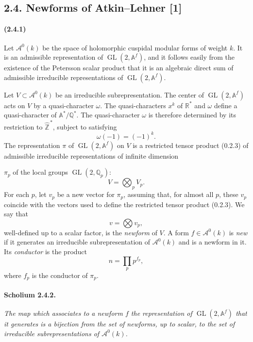\documentclass[10pt,a4paper]{article}
\providecommand{\GL}{\operatorname{GL}}
\providecommand{\R}{\mathbb R}
\providecommand{\Q}{\mathbb Q}
\providecommand{\Z}{\mathbb Z}
\providecommand{\A}{\mathbb A}
\providecommand{\Af}{\mathbb A^f}
\begin{document}
\subsection*{2.4. Newforms of Atkin--Lehner [1]}

\paragraph{(2.4.1)} Let \(\mathcal A^0(k)\) be the space of holomorphic cuspidal modular forms of weight \(k\). It is an admissible representation of \(\GL(2,\Af)\), and it follows easily from the existence of the Petersson scalar product that it is an algebraic direct sum of admissible irreducible representations of \(\GL(2,\Af)\).

Let \(V\subset \mathcal A^0(k)\) be an irreducible subrepresentation. The center of \(\GL(2,\Af)\) acts on \(V\) by a quasi-character \(\omega\). The quasi-characters \(x^k\) of \(\R^*\) and \(\omega\) define a quasi-character of \(\A^*/\Q^*\). The quasi-character \(\omega\) is therefore determined by its restriction to \(\widehat{\Z}^{\,*}\), subject to satisfying
\[
\omega(-1)=(-1)^k.
\]
The representation \(\pi\) of \(\GL(2,\Af)\) on \(V\) is a restricted tensor product (0.2.3) of admissible irreducible representations of infinite dimension

\clearpage
{}
\hypertarget{authority-31}{}
\(\pi_p\) of the local groups \(\GL(2,\Q_p)\):
\[
V=\bigotimes_p V_p.
\]
For each \(p\), let \(v_p\) be a new vector for \(\pi_p\), assuming that, for almost all \(p\), these \(v_p\) coincide with the vectors used to define the restricted tensor product (0.2.3). We say that
\[
v=\bigotimes v_p,
\]
well-defined up to a scalar factor, is the \emph{newform} of \(V\). A form \(f\in \mathcal A^0(k)\) is \emph{new} if it generates an irreducible subrepresentation of \(\mathcal A^0(k)\) and is a newform in it. Its \emph{conductor} is the product
\[
n=\prod_p p^{f_p},
\]
where \(f_p\) is the conductor of \(\pi_p\).

\paragraph{Scholium 2.4.2.}{\itshape  The map which associates to a newform \(f\) the representation of \(\GL(2,\Af)\) that it generates is a bijection from the set of newforms, up to scalar, to the set of irreducible subrepresentations of \(\mathcal A^0(k)\).\par}
\end{document}

